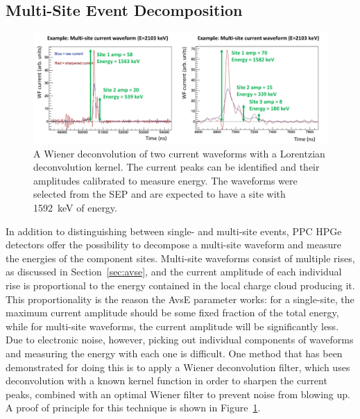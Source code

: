 \documentclass[/main.tex]{subfiles}
\begin{document}
  \subsection{Multi-Site Event Decomposition}
\begin{figure}[h]
  \centering
  \includegraphics[width=\textwidth]{wienercurrent}
  \caption[Proof of principle for multi-site event decomposition]{\label{fig:wienercurrent}
    A Wiener deconvolution of two current waveforms with a Lorentzian deconvolution kernel. The current peaks can be identified and their amplitudes calibrated to measure energy. The waveforms were selected from the SEP and are expected to have a site with 1592~keV of energy.
  }
\end{figure}
In addition to distinguishing between single- and multi-site events, PPC HPGe detectors offer the possibility to decompose a multi-site waveform and measure the energies of the component sites.
Multi-site waveforms consist of multiple rises, as discussed in Section~\ref{sec:avse}, and the current amplitude of each individual rise is proportional to the energy contained in the local charge cloud producing it.
This proportionality is the reason the AvsE parameter works: for a single-site, the maximum current amplitude should be some fixed fraction of the total energy, while for multi-site waveforms, the current amplitude will be significantly less.
Due to electronic noise, however, picking out individual components of waveforms and measuring the energy with each one is difficult.
One method that has been demonstrated for doing this is to apply a Wiener deconvolution filter, which uses deconvolution with a known kernel function in order to sharpen the current peaks, combined with an optimal Wiener filter to prevent noise from blowing up.
A proof of principle for this technique is shown in Figure~\ref{fig:wienercurrent}.
\end{document}

